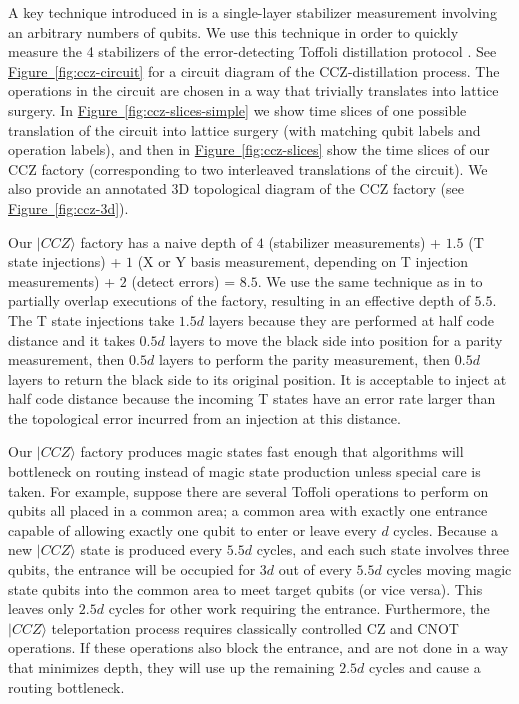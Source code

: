 \documentclass[twocolumn,accepted=2019-03-30]{quantumarticle}
\newcommand{\fig}[1]{\hyperref[fig:#1]{Figure~\ref*{fig:#1}}}
\begin{document}
A key technique introduced in \cite{fowler2018} is a single-layer stabilizer measurement involving an arbitrary numbers of qubits.
We use this technique in order to quickly measure the 4 stabilizers of the error-detecting Toffoli distillation protocol \cite{jones2013, eastin2013distilling}.
See \fig{ccz-circuit} for a circuit diagram of the CCZ-distillation process.
The operations in the circuit are chosen in a way that trivially translates into lattice surgery.
In \fig{ccz-slices-simple} we show time slices of one possible translation of the circuit into lattice surgery (with matching qubit labels and operation labels), and then in \fig{ccz-slices} show the time slices of our CCZ factory (corresponding to two interleaved translations of the circuit).
We also provide an annotated 3D topological diagram of the CCZ factory (see \fig{ccz-3d}).

Our $|CCZ\rangle$ factory has a naive depth of $4$ (stabilizer measurements) + $1.5$ (T state injections) + $1$ (X or Y basis measurement, depending on T injection measurements) + $2$ (detect errors) = $8.5$.
We use the same technique as in \cite{fowler2018} to partially overlap executions of the factory, resulting in an effective depth of $5.5$.
The T state injections take $1.5d$ layers because they are performed at half code distance and it takes $0.5d$ layers to move the black side into position for a parity measurement, then $0.5d$ layers to perform the parity measurement, then $0.5d$ layers to return the black side to its original position.
It is acceptable to inject at half code distance because the incoming T states have an error rate larger than the topological error incurred from an injection at this distance.

Our $|CCZ\rangle$ factory produces magic states fast enough that algorithms will bottleneck on routing instead of magic state production unless special care is taken.
For example, suppose there are several Toffoli operations to perform on qubits all placed in a common area; a common area with exactly one entrance capable of allowing exactly one qubit to enter or leave every $d$ cycles.
Because a new $|CCZ\rangle$ state is produced every $5.5d$ cycles, and each such state involves three qubits, the entrance will be occupied for $3d$ out of every $5.5d$ cycles moving magic state qubits into the common area to meet target qubits (or vice versa). This leaves only $2.5d$ cycles for other work requiring the entrance.
Furthermore, the $|CCZ\rangle$ teleportation process requires classically controlled CZ and CNOT operations.
If these operations also block the entrance, and are not done in a way that minimizes depth, they will use up the remaining $2.5d$ cycles and cause a routing bottleneck.
\end{document}
